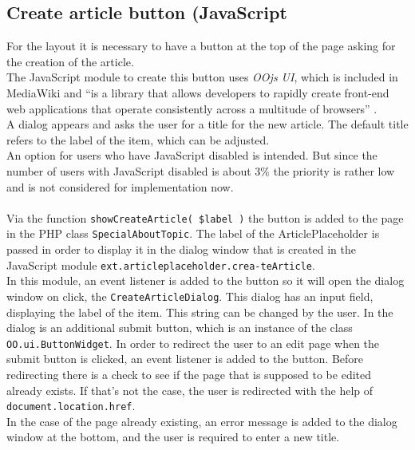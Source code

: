 \subsection{Create article button (JavaScript}
		
For the layout it is necessary to have a button at the top of the page asking for the creation of the article. \\
The JavaScript module to create this button uses \textit{OOjs UI}, which is included in MediaWiki and ``is a library that allows developers to rapidly create front-end web applications that operate consistently across a multitude of browsers'' \citep{wiki:27}. \\
A dialog appears and asks the user for a title for the new article. The default title refers to the label of the item, which can be adjusted. \\
An option for users who have JavaScript disabled is intended. But since the number of users with JavaScript disabled is about 3\% \citep{wiki:02} the priority is rather low and is not considered for implementation now. \\
\\
Via the function \texttt{\justify showCreateArticle( \$label )} the button is added to the page in the PHP class \texttt{\justify SpecialAboutTopic}. The label of the ArticlePlaceholder is passed in order to display it in the dialog window that is created in the JavaScript module \texttt{\justify ext.articleplaceholder.crea-teArticle}. \\
In this module, an event listener is added to the button so it will open the dialog window on click, the \texttt{CreateArticleDialog}. This dialog has an input field, displaying the label of the item. This string can be changed by the user. In the dialog is an additional submit button, which is an instance of the class \texttt{OO.ui.ButtonWidget}. In order to redirect the user to an edit page when the submit button is clicked, an event listener is added to the button. Before redirecting there is a check to see if the page that is supposed to be edited already exists. If that's not the case, the user is redirected with the help of \texttt{\justify document.location.href}. \\
In the case of the page already existing, an error message is added to the dialog window at the bottom, and the user is required to enter a new title.